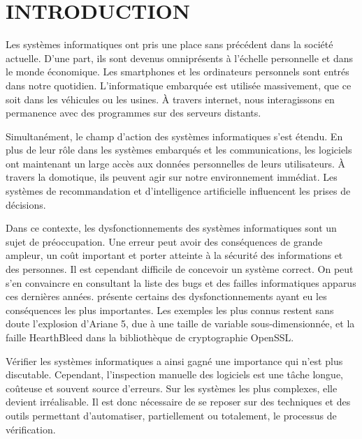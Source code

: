 
\chapter{INTRODUCTION}\label{sec:Introduction}  %

Les systèmes informatiques ont pris une place sans précédent dans la société
actuelle. D'une part, ils sont devenus omniprésents à l'échelle personnelle et
dans le monde économique. Les smartphones et les ordinateurs personnels sont
entrés dans notre quotidien. L'informatique embarquée est utilisée massivement,
que ce soit dans les véhicules ou les usines. À travers internet, nous
interagissons en permanence avec des programmes sur des serveurs distants.

Simultanément, le champ d'action des systèmes informatiques s'est étendu. En
plus de leur rôle dans les systèmes embarqués et les communications, les
logiciels ont maintenant un large accès aux données personnelles de leurs
utilisateurs. À travers la domotique, ils peuvent agir sur notre environnement
immédiat. Les systèmes de recommandation et d'intelligence artificielle
influencent les prises de décisions.

Dans ce contexte, les dysfonctionnements des systèmes informatiques sont un
sujet de préoccupation. Une erreur peut avoir des conséquences de grande
ampleur, un coût important et porter atteinte à la sécurité des informations et
des personnes. Il est cependant difficile de concevoir un système correct. On
peut s'en convaincre en consultant la liste des bugs et des failles
informatiques apparus ces dernières années. \cite{horror_story} présente
certains des dysfonctionnements ayant eu les conséquences les plus importantes.
Les exemples les plus connus restent sans doute l'explosion d'Ariane 5, due à
une taille de variable sous-dimensionnée, et la faille HearthBleed dans la
bibliothèque de cryptographie OpenSSL.

Vérifier les systèmes informatiques a ainsi gagné une importance qui n'est
plus discutable. Cependant, l'inspection manuelle des logiciels est une
tâche longue, coûteuse et souvent source d'erreurs. Sur les systèmes les
plus complexes, elle devient irréalisable. Il est donc nécessaire de se
reposer sur des techniques et des outils permettant d'automatiser,
partiellement ou totalement, le processus de vérification.

